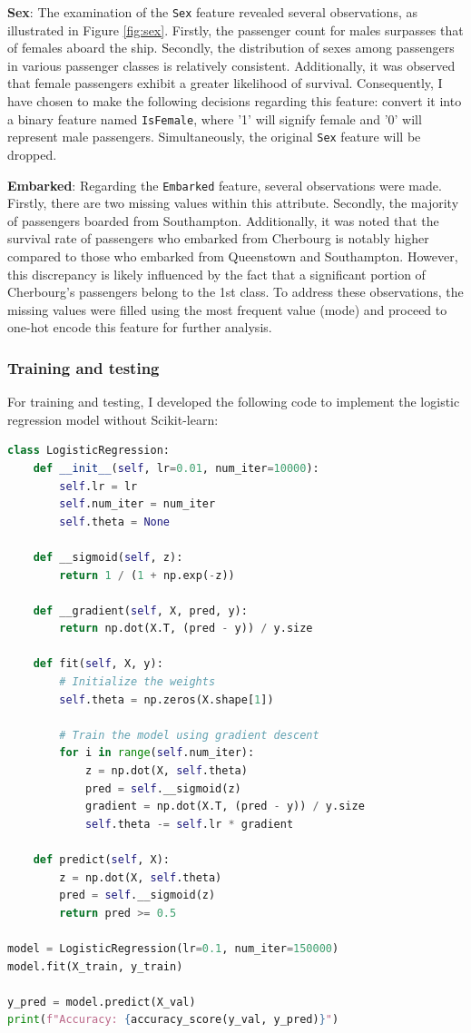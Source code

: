 \documentclass[10pt]{article}
\begin{document}
\textbf{Sex}: The examination of the \texttt{Sex} feature revealed several observations, as illustrated in Figure \ref{fig:sex}. Firstly, the passenger count for males surpasses that of females aboard the ship. Secondly, the distribution of sexes among passengers in various passenger classes is relatively consistent. Additionally, it was observed that female passengers exhibit a greater likelihood of survival. Consequently, I have chosen to make the following decisions regarding this feature: convert it into a binary feature named \texttt{IsFemale}, where '1' will signify female and '0' will represent male passengers. Simultaneously, the original \texttt{Sex} feature will be dropped.

\textbf{Embarked}: Regarding the \texttt{Embarked} feature, several observations were made. Firstly, there are two missing values within this attribute. Secondly, the majority of passengers boarded from Southampton. Additionally, it was noted that the survival rate of passengers who embarked from Cherbourg is notably higher compared to those who embarked from Queenstown and Southampton. However, this discrepancy is likely influenced by the fact that a significant portion of Cherbourg's passengers belong to the 1st class. To address these observations, the missing values were filled using the most frequent value (mode) and proceed to one-hot encode this feature for further analysis.


\subsubsection{Training and testing}

For training and testing, I developed the following code to implement the logistic regression model without Scikit-learn:

\begin{lstlisting}[language=Python]
class LogisticRegression:
    def __init__(self, lr=0.01, num_iter=10000):
        self.lr = lr
        self.num_iter = num_iter
        self.theta = None

    def __sigmoid(self, z):
        return 1 / (1 + np.exp(-z))

    def __gradient(self, X, pred, y):
        return np.dot(X.T, (pred - y)) / y.size

    def fit(self, X, y):
        # Initialize the weights
        self.theta = np.zeros(X.shape[1])

        # Train the model using gradient descent
        for i in range(self.num_iter):
            z = np.dot(X, self.theta)
            pred = self.__sigmoid(z)
            gradient = np.dot(X.T, (pred - y)) / y.size
            self.theta -= self.lr * gradient

    def predict(self, X):
        z = np.dot(X, self.theta)
        pred = self.__sigmoid(z)
        return pred >= 0.5

model = LogisticRegression(lr=0.1, num_iter=150000)
model.fit(X_train, y_train)

y_pred = model.predict(X_val)
print(f"Accuracy: {accuracy_score(y_val, y_pred)}")
\end{lstlisting}
\end{document}
